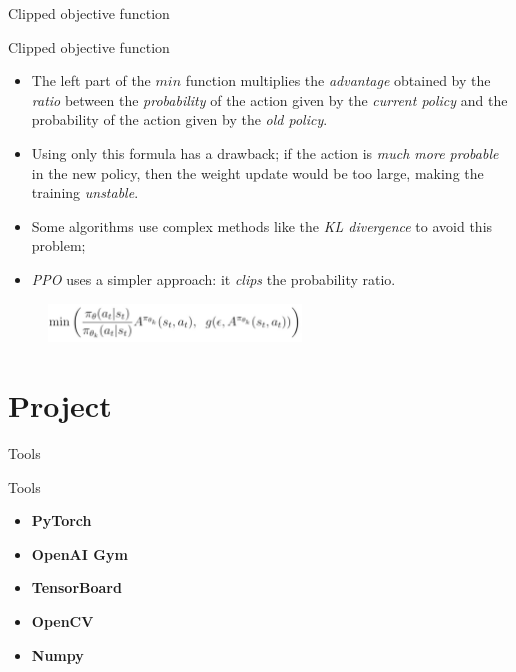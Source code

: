 \documentclass[presentation]{beamer}\mode<presentation>{\usetheme{AMSBolognaFC}}
\begin{document}
\begin{frame}{Clipped objective function}

\begin{block}{Clipped objective function}
	\begin{itemize}
		\item The left part of the $min$ function multiplies the \emph{advantage} obtained by the \emph{ratio} between 
			the \emph{probability} of the action given by the \emph{current policy} and the probability of the action 
			given by the \emph{old policy}. 
		\item Using only this formula has a drawback; if the action is \emph{much more probable} in the new policy,
			then the weight update would be too large, making the training \emph{unstable}.
		\item Some algorithms use complex methods like the \emph{KL divergence} to avoid this problem; 
		\item \emph{PPO} uses a simpler approach: it \emph{clips} the probability ratio. 
	\end{itemize}
\end{block}

\begin{figure}
	\includegraphics[width=0.6\textwidth]{img/clippedobjfun.png}
\end{figure}	
\end{frame}


\section{Project}

\begin{frame}{Tools}
\begin{block}{Tools}
	\begin{itemize}
		\item \textbf{PyTorch}
		\item \textbf{OpenAI Gym}
		\item \textbf{TensorBoard}
		\item \textbf{OpenCV}
		\item \textbf{Numpy}
	\end{itemize}
\end{block}
\end{frame}
\end{document}
